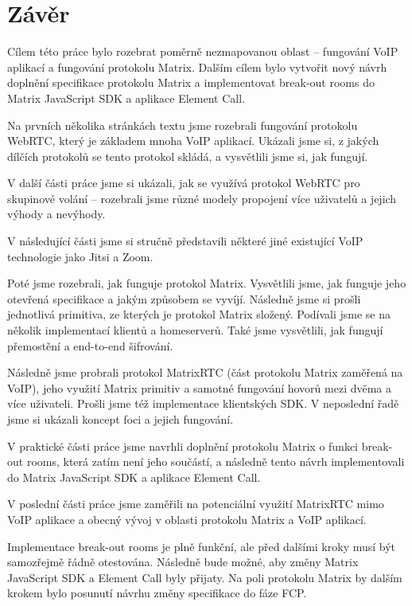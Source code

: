 \section{Závěr}

Cílem této práce bylo rozebrat poměrně nezmapovanou oblast -- fungování VoIP
aplikací a fungování protokolu Matrix. Dalším cílem bylo vytvořit nový návrh
doplnění specifikace protokolu Matrix a implementovat break-out rooms do Matrix
JavaScript SDK a aplikace Element Call.

Na prvních několika stránkách textu jsme rozebrali fungování protokolu WebRTC,
který je základem mnoha VoIP aplikací. Ukázali jsme si, z jakých dílčích
protokolů se tento protokol skládá, a vysvětlili jsme si, jak fungují.

V další části práce jsme si ukázali, jak se využívá protokol WebRTC pro
skupinové volání -- rozebrali jsme různé modely propojení více uživatelů a
jejich výhody a nevýhody.

V následující části jsme si stručně představili některé jiné existující VoIP
technologie jako Jitsi a Zoom.

Poté jsme rozebrali, jak funguje protokol Matrix. Vysvětlili jsme, jak funguje
jeho otevřená specifikace a jakým způsobem se vyvíjí. Následně jsme si prošli
jednotlivá primitiva, ze kterých je protokol Matrix složený. Podívali jsme se na
několik implementací klientů a homeserverů. Také jsme vysvětlili, jak fungují
přemostění a end-to-end šifrování.

Následně jsme probrali protokol MatrixRTC (část protokolu Matrix zaměřená na
VoIP), jeho využití Matrix primitiv a samotné fungování hovorů mezi dvěma a více
uživateli. Prošli jsme též implementace klientských SDK. V neposlední řadě jsme
si ukázali koncept foci a jejich fungování.

V praktické části práce jsme navrhli doplnění protokolu Matrix o funkci
break-out rooms, která zatím není jeho součástí, a následně tento návrh
implementovali do Matrix JavaScript SDK a aplikace Element Call.

V poslední části práce jsme zaměřili na potenciální využití MatrixRTC mimo VoIP
aplikace a obecný vývoj v oblasti protokolu Matrix a VoIP aplikací.

Implementace break-out rooms je plně funkční, ale před dalšími kroky musí být
samozřejmě řádně otestována. Následně bude možné, aby změny Matrix JavaScript
SDK a Element Call byly přijaty. Na poli protokolu Matrix  by dalším krokem bylo
posunutí návrhu změny specifikace do fáze FCP.
